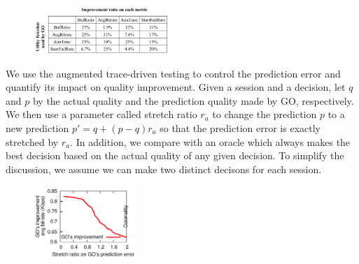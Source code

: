 \begin{figure}[h!]
\centering
 \includegraphics[width=0.45\textwidth] {figures/newfig/cross-metric.pdf}
\label{fig:cross-metrics}
\end{figure}



\label{subsec:impact-accuracy}


We use the augmented trace-driven testing to control the prediction
error and quantify its impact on quality improvement. Given a session
and a decision, let $q$ and $p$ by the actual quality and the
prediction quality made by GO, respectively. We then use a parameter
called stretch ratio $r_a$ to change the prediction $p$ to a new
prediction $p'=q+(p-q)r_a$ so that the prediction error is exactly
stretched by $r_a$.  In addition, we compare with an oracle which
always makes the best decision based on the actual quality of any
given decision. To simplify the discussion, we assume we can make two
distinct decisons for each session.

\begin{figure}[h!]
\centering
 \includegraphics[width=0.35\textwidth] {figures/newfig/trendAccuracy-metricId1-keyGlobal-partition.pdf}
\label{fig:trace-accuracy-2}
\end{figure}


